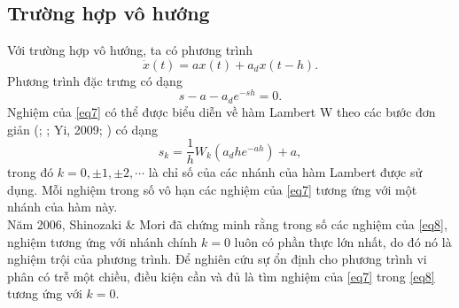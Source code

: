 \subsection{Trường hợp vô hướng}
Với trường hợp vô hướng, ta có phương trình
\begin{equation}\label{eq6}
	\dot{x}(t)=ax(t) + a_dx(t -h).
\end{equation}
Phương trình đặc trưng có dạng
\begin{equation}\label{eq7}
	s - a - a_d e ^{-s h} = 0.
\end{equation}
Nghiệm của \eqref{eq7} có thể được biểu diễn về hàm Lambert W theo các bước đơn giản (\cite{AslU03}; \cite{Cor96}; Yi, 2009; \cite{Yi10}) có dạng 
\begin{equation}\label{eq8}
	s_k = \dfrac{1}{h}W_k(a_d h e^{-ah})+a,
\end{equation}
trong đó $k = 0, \pm 1, \pm2, \cdots$ là chỉ số của các nhánh của hàm Lambert được sử dụng. Mỗi nghiệm trong số vô hạn các nghiệm của \eqref{eq7} tương ứng với một nhánh của hàm này.\\
Năm 2006, Shinozaki \& Mori đã chứng minh rằng trong số các nghiệm của \eqref{eq8}, nghiệm tương ứng với nhánh chính $k =0$ luôn có phần thực lớn nhất, do đó nó là nghiệm trội của phương trình. Để nghiên cứu sự ổn định cho phương trình vi phân có trễ một chiều, điều kiện cần và đủ  là tìm nghiệm của \eqref{eq7} trong \eqref{eq8} tương ứng với $k =0$.\\


